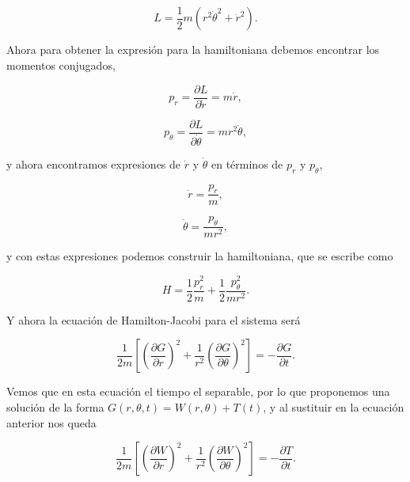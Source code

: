 \documentclass[a4paper,10pt]{article}
\numberwithin{equation}{section}
\begin{document}
\begin{equation}
 L = \frac{1}{2}m(r^2\dot{\theta}^2 + \dot{r}^2).
\end{equation}

Ahora para obtener la expresión para la hamiltoniana debemos encontrar los momentos 
conjugados,

\begin{equation}
 p_r = \frac{\partial L}{\partial \dot{r}} = m\dot{r},
\end{equation}

\begin{equation}
 p_\theta = \frac{\partial L}{\partial \dot{\theta}} = mr^2\dot{\theta},
\end{equation}

y ahora encontramos expresiones de $\dot{r}$ y $\dot{\theta}$ en términos de 
$p_r$ y $p_\theta$,

\begin{equation}
 \dot{r} = \frac{p_r}{m},
\end{equation}

\begin{equation}
 \dot{\theta} = \frac{p_\theta}{mr^2},
\end{equation}

y con estas expresiones podemos construir la hamiltoniana, que se escribe como 

\begin{equation}
 H = \frac{1}{2}\frac{p_r^2}{m} + \frac{1}{2}\frac{p_\theta^2}{mr^2}.
\end{equation}

Y ahora la ecuación de Hamilton-Jacobi para el sistema será 

\begin{equation}
 \frac{1}{2m}\left[\left(\frac{\partial G}{\partial r} \right)^2 
 + \frac{1}{r^2}\left( \frac{\partial G}{\partial \theta}\right)^2\right] = 
 - \frac{\partial G}{\partial t}.
\end{equation}

Vemos que en esta ecuación el tiempo el separable, por lo que proponemos una solución 
de la forma $G(r,\theta,t) = W(r,\theta) + T(t)$, y al sustituir en la ecuación anterior 
nos queda 

\begin{equation}
 \frac{1}{2m}\left[\left(\frac{\partial W}{\partial r} \right)^2 
 + \frac{1}{r^2}\left( \frac{\partial W}{\partial \theta}\right)^2\right] = 
 - \frac{\partial T}{\partial t}.
\end{equation}
\end{document}

